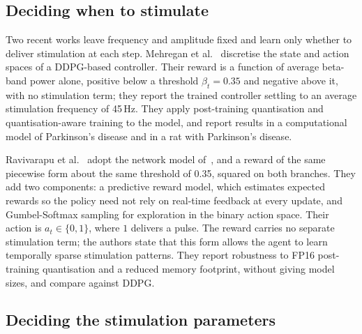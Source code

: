 %
%


\subsection*{Deciding when to stimulate}

Two recent works leave frequency and amplitude fixed and learn only whether to
deliver stimulation at each step. Mehregan et al.~\cite{mehregan2024enhancing}
discretise the state and action spaces of a DDPG-based controller. Their
reward is a function of average beta-band power alone, positive below a
threshold $\beta_t = 0.35$ and negative above it, with no stimulation term;
they report the trained controller settling to an average stimulation
frequency of 45\,Hz. They apply post-training quantisation and
quantisation-aware training to the model, and report results in a
computational model of Parkinson's disease and in a rat with Parkinson's
disease.

Ravivarapu et al.~\cite{ravivarapu2025sea} adopt the network model
of~\cite{mehregan2024enhancing}, and a reward of the same piecewise form about
the same threshold of 0.35, squared on both branches. They add two components:
a predictive reward model, which estimates expected rewards so the policy need
not rely on real-time feedback at every update, and Gumbel-Softmax sampling
for exploration in the binary action space. Their action is
$a_t \in \{0, 1\}$, where $1$ delivers a pulse. The reward carries no separate
stimulation term; the authors state that this form allows the agent to learn
temporally sparse stimulation patterns. They report robustness to FP16
post-training quantisation and a reduced memory footprint, without giving
model sizes, and compare against DDPG.


\subsection*{Deciding the stimulation parameters}

